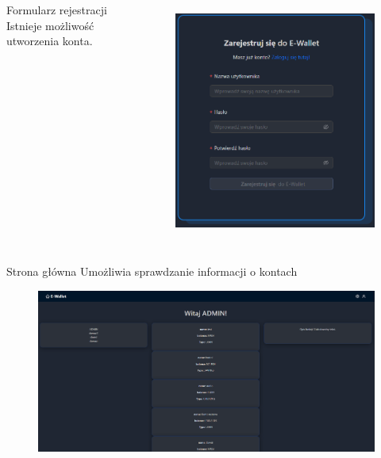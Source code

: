 \begin{frame}{\insertsection}
	\begin{columns}
		\begin{block}{Formularz rejestracji}
			Istnieje możliwość utworzenia konta.
		\end{block}
		\begin{figure}
			\centering
			\includegraphics[width=1\linewidth]{../images/Rejestracja}
			\label{fig:rejestracja}
		\end{figure}
	\end{columns}
\end{frame}

\begin{frame}{\insertsection}
	\begin{block}{Strona główna}
		Umożliwia sprawdzanie informacji o kontach	
	\end{block}
	\begin{figure}
		\centering
		\includegraphics[width=0.9\linewidth]{../images/MotywCiemny}
	\end{figure}
\end{frame}

